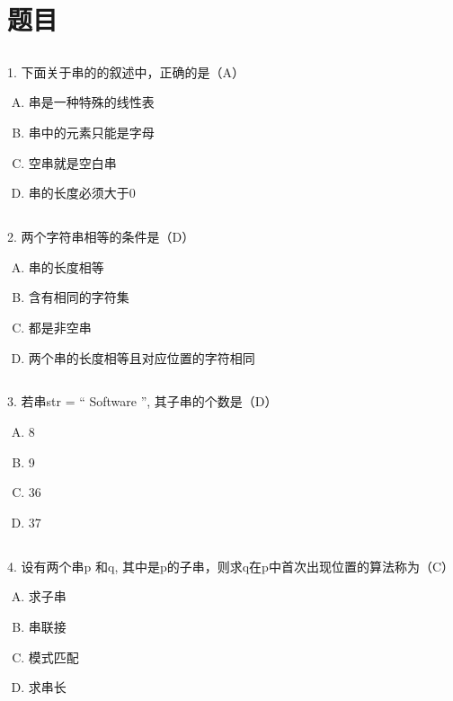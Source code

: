 \documentclass[12pt,hyperref,a4paper,UTF8]{ctexart}
\begin{document}
\cover
\thispagestyle{empty}%


\newpage
\tableofcontents

\newpage
\section{题目}

\subsection{}

1. 下面关于串的的叙述中，正确的是（A）
\begin{enumerate}[A.]
    \item 串是一种特殊的线性表
    \item 串中的元素只能是字母
    \item 空串就是空白串
    \item 串的长度必须大于0
\end{enumerate}

\subsection{}
2. 两个字符串相等的条件是（D）
\begin{enumerate}[A.]
    \item 串的长度相等
    \item 含有相同的字符集
    \item 都是非空串
    \item 两个串的长度相等且对应位置的字符相同
\end{enumerate}

\subsection{}
3. 若串str = “ Software ”, 其子串的个数是（D）
\begin{enumerate}[A.]
    \item 8
    \item 9
    \item 36
    \item 37
\end{enumerate}

\subsection{}
4. 设有两个串p 和q, 其中是p的子串，则求q在p中首次出现位置的算法称为（C）
\begin{enumerate}[A.]
    \item 求子串
    \item 串联接
    \item 模式匹配
    \item 求串长
\end{enumerate}
\end{document}

